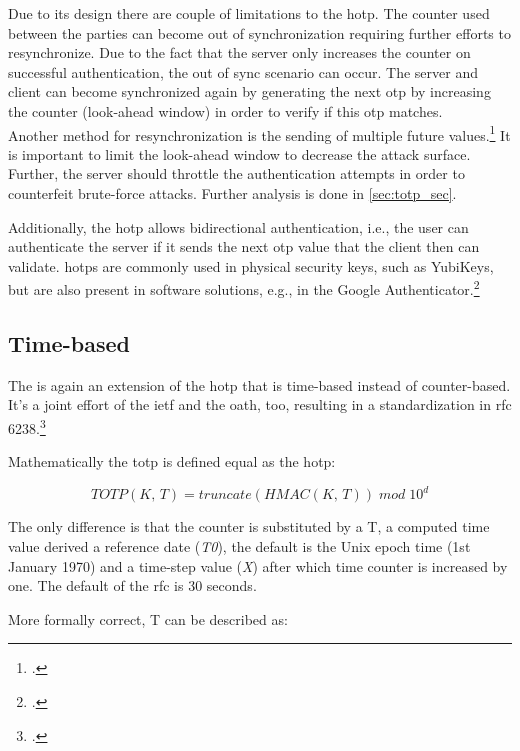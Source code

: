 Due to its design there are couple of limitations to the \gls{hotp}. The counter used between the parties can become out of synchronization requiring further efforts to resynchronize. Due to the fact that the server only increases the counter on successful authentication, the out of sync scenario can occur. The server and client can become synchronized again by generating the next \gls{otp} by increasing the counter (look-ahead window) in order to verify if this \gls{otp} matches.\\
Another method for resynchronization is the sending of multiple future values.\footcites[See][236]{Schwartz2018}[See][Chapter 13.5.1]{2308830} It is important to limit the look-ahead window to decrease the attack surface. Further, the server should throttle the authentication attempts in order to counterfeit brute-force attacks. Further analysis is done in \autoref{sec:totp_sec}.

Additionally, the \gls{hotp} allows bidirectional authentication, i.e., the user can authenticate the server if it sends the next \gls{otp} value that the client then can validate. \Glspl{hotp} are commonly used in physical security keys, such as YubiKeys, but are also present in software solutions, e.g., in the Google Authenticator.\footcites[See][716]{Vacca2017aa}[See][14]{m2005rfc}

\subsection{Time-based}
\label{subsec:totp}

The  is again an extension of the \gls{hotp} that is time-based instead of counter-based. It's a joint effort of the \gls{ietf} and the \gls{oath}, too, resulting in a standardization in \gls{rfc} 6238.\footcite[See][]{m2011rfc}

Mathematically the \gls{totp} is defined equal as the \gls{hotp}:

\begin{equation*}
	TOTP(K,\, T) = truncate(HMAC(K,\, T))\; mod \; 10^d
\end{equation*}

The only difference is that the counter is substituted by a T, a computed time value derived a reference date (\textit{T0}), the default is the Unix epoch time (1st January 1970) and a time-step value (\textit{X}) after which time counter is increased by one. The default of the \gls{rfc} is 30 seconds.

More formally correct, T can be described as:

